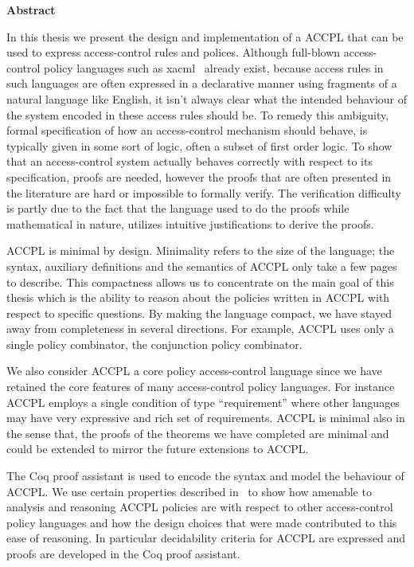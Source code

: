
\begin{center}\textbf{Abstract}\end{center}

In this thesis we present the design and implementation of a \ac{ACCPL} that can be used to express access-control rules and polices. Although full-blown access-control policy languages such as \ac{xacml}~\cite{xacml} already exist, because access rules in such languages are often expressed in a declarative manner using fragments of a natural language like English, it isn't always clear what the intended behaviour of the system encoded in these access rules should be. To remedy this ambiguity, formal specification of how an access-control mechanism should behave, is typically given in some sort of logic, often a subset of first order logic. To show that an access-control system actually behaves correctly with respect to its specification, proofs are needed, however the proofs that are often presented in the literature are hard or impossible to formally verify. The verification difficulty is partly due to the fact that the language used to do the proofs while mathematical in nature, utilizes intuitive justifications to derive the proofs. 

\ac{ACCPL} is minimal by design. Minimality refers to the size of the language; the syntax, auxiliary definitions and the semantics of \ac{ACCPL} only take a few pages to describe. This compactness allows us to concentrate on the main goal of this thesis which is the ability to reason about the policies written in \ac{ACCPL} with respect to specific questions. By making the language compact, we have stayed away from completeness in several directions. For example, \ac{ACCPL} uses only a single policy combinator, the conjunction policy combinator. 

We also consider \ac{ACCPL} a core policy access-control language since we have retained the core features of many access-control policy languages. For instance \ac{ACCPL} employs a single condition of type ``requirement'' where other languages may have very expressive and rich set of requirements. \ac{ACCPL} is minimal also in the sense that, the proofs of the theorems we have completed are minimal and could be extended to mirror the future extensions to \ac{ACCPL}.

The Coq proof assistant is used to encode the syntax and model the behaviour of \ac{ACCPL}. We use certain properties described in~\cite{Tschantz} to show how amenable to analysis and reasoning \ac{ACCPL} policies are with respect to other access-control policy languages and how the design choices that were made contributed to this ease of reasoning. In particular decidability criteria for \ac{ACCPL} are expressed and proofs are developed in the Coq proof assistant.


\cleardoublepage

